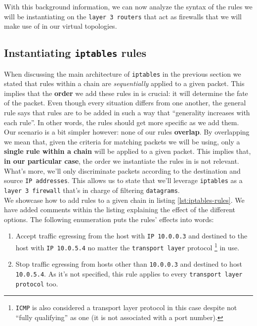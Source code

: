             With this background information, we can now analyze the syntax of the rules we will be instantiating on the \texttt{layer 3 routers} that act as firewalls that we will make use of in our virtual topologies.\\

        \subsection{Instantiating \texttt{iptables} rules}
            When discussing the main architecture of \texttt{iptables} in the previous section we stated that rules within a chain are \textit{sequentially} applied to a given packet. This implies that the \textbf{order} we add these rules in is crucial: it will determine the fate of the packet. Even though every situation differs from one another, the general rule says that rules are to be added in such a way that ``generality increases with each rule''. In other words, the rules should get more specific as we add them.\\

            Our scenario is a bit simpler however: none of our rules \textbf{overlap}. By overlapping we mean that, given the criteria for matching packets we will be using, only a \textbf{single rule within a chain} will be applied to a given packet. This implies that, \textbf{in our particular case}, the order we instantiate the rules in is not relevant. What's more, we'll only discriminate packets according to the destination and source \texttt{IP addresses}. This allows us to state that we'll leverage \texttt{iptables} as a \texttt{layer 3 firewall} that's in charge of filtering \texttt{datagrams}.\\

            We showcase how to add rules to a given chain in listing \ref{lst:iptables-rules}. We have added comments within the listing explaining the effect of the different options. The following enumeration puts the rules' effects into words:\\

            \begin{enumerate}
                \item Accept traffic egressing from the host with \texttt{IP 10.0.0.3} and destined to the host with \texttt{IP 10.0.5.4} no matter the \texttt{transport layer} protocol \footnote{\texttt{ICMP} is also considered a transport layer protocol in this case despite not ``fully qualifying'' as one (it is not associated with a port number).} in use.
                \item Stop traffic egressing from hosts other than \texttt{10.0.0.3} and destined to host \texttt{10.0.5.4}. As it's not specified, this rule applies to every \texttt{transport layer protocol} too.
            \end{enumerate}

